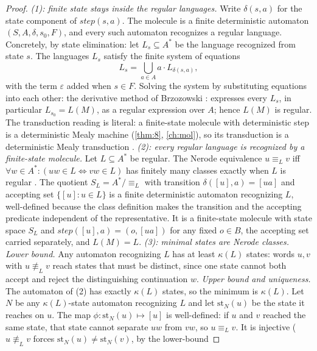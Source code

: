 \begin{proof}
\emph{(1): finite state stays inside the regular languages.} Write
$\delta (s, a)$ for the state component of $\mathit{step} (s, a)$. The molecule
is a finite deterministic automaton $(S, A, \delta, s_0, F)$, and every such
automaton recognizes a regular language. Concretely, by state elimination:
let $L_s \subseteq A^{*}$ be the language recognized from state $s$. The
languages $L_s$ satisfy the finite system of equations
\[
L_s = \bigcup_{a \in A} a \cdot L_{\delta (s,a)},
\]
with the term $\varepsilon$ added when $s \in F$. Solving the system by
substituting equations into each other: the derivative method of Brzozowski
\cite{brzozowski}: expresses every $L_s$, in particular $L_{s_0} = L (M)$,
as a regular expression over $A$; hence $L (M)$ is regular. The transduction
reading is literal: a finite-state molecule with deterministic step is a
deterministic Mealy machine (\autoref{thm:8}, \autoref{ch:mol}), so its transduction is a
deterministic Mealy transduction \cite{mealy}.
\emph{(2): every regular language is recognized by a finite-state molecule.}
Let $L \subseteq A^{*}$ be regular. The Nerode equivalence $u \equiv_L v$ iff
$\forall w \in A^{*} \colon (uw \in L \Leftrightarrow vw \in L)$ has finitely
many classes exactly when $L$ is regular \cite{nerode}. The quotient
$S_L = A^{*} / \equiv_L$ with transition $\delta ([u], a) = [ua]$ and accepting
set $\{[u] : u \in L\}$ is a finite deterministic automaton recognizing $L$,
well-defined because the class definition makes the transition and the
accepting predicate independent of the representative. It is a finite-state
molecule with state space $S_L$ and $\mathit{step} ([u], a) = (o, [ua])$ for
any fixed $o \in B$, the accepting set carried separately, and $L (M) = L$.
\emph{(3): minimal states are Nerode classes.} \emph{Lower bound.} Any
automaton recognizing $L$ has at least $\kappa (L)$ states: words $u, v$ with
$u \not\equiv_L v$ reach states that must be distinct, since one state cannot
both accept and reject the distinguishing continuation $w$.
\emph{Upper bound and uniqueness.} The automaton of (2) has exactly
$\kappa (L)$ states, so the minimum is $\kappa (L)$. Let $N$ be any
$\kappa (L)$-state automaton recognizing $L$ and let $\mathrm{st}_N (u)$ be the
state it reaches on $u$. The map $\phi \colon \mathrm{st}_N (u) \mapsto [u]$ is
well-defined: if $u$ and $v$ reached the same state, that state cannot
separate $uw$ from $vw$, so $u \equiv_L v$. It is injective ($u \not\equiv_L
v$ forces $\mathrm{st}_N (u) \neq \mathrm{st}_N (v)$, by the lower-bound

\end{proof}
